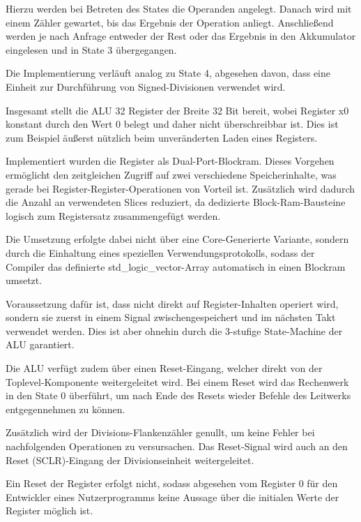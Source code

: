 Hierzu werden bei Betreten des States die Operanden angelegt. Danach wird mit einem Z\"ahler gewartet, bis das Ergebnis der Operation anliegt.
Anschlie\ss{}end werden je nach Anfrage entweder der Rest oder das Ergebnis in den Akkumulator eingelesen und in State 3 \"ubergegangen.

Die Implementierung verl\"auft analog zu State 4, abgesehen davon, dass eine Einheit zur Durchf\"uhrung von Signed-Divisionen verwendet wird.

Insgesamt stellt die ALU 32 Register der Breite 32 Bit bereit, wobei Register x0 konstant durch den Wert 0 belegt und daher nicht \"uberschreibbar ist. Dies ist zum Beispiel \"au\ss{}erst n\"utzlich beim unver\"anderten Laden eines Registers.

Implementiert wurden die Register als Dual-Port-Blockram. Dieses Vorgehen erm\"oglicht den zeitgleichen Zugriff auf zwei verschiedene Speicherinhalte, was gerade bei Register-Register-Operationen von Vorteil ist. Zus\"atzlich wird dadurch die Anzahl an verwendeten Slices reduziert, da dedizierte Block-Ram-Bausteine logisch zum Registersatz zusammengef\"ugt werden.\vspace{10pt}

Die Umsetzung erfolgte dabei nicht \"uber eine Core-Generierte Variante, sondern durch die Einhaltung eines speziellen Verwendungsprotokolls, sodass der Compiler das definierte std\_logic\_vector-Array automatisch in einen Blockram umsetzt.

Voraussetzung daf\"ur ist, dass nicht direkt auf Register-Inhalten operiert wird, sondern sie zuerst in einem Signal zwischengespeichert und im n\"achsten Takt verwendet werden. Dies ist aber ohnehin durch die 3-stufige State-Machine der ALU garantiert.

Die ALU verf\"ugt zudem \"uber einen Reset-Eingang, welcher direkt von der Toplevel-Komponente weitergeleitet wird. Bei einem Reset wird das Rechenwerk in den State 0 \"uberf\"uhrt, um nach Ende des Resets wieder Befehle des Leitwerks entgegennehmen zu k\"onnen.

Zus\"atzlich wird der Divisions-Flankenz\"ahler genullt, um keine Fehler bei nachfolgenden Operationen zu versursachen. Das Reset-Signal wird auch an den Reset (SCLR)-Eingang der Divisionseinheit weitergeleitet.

Ein Reset der Register erfolgt nicht, sodass abgesehen vom Register 0 f\"ur den Entwickler eines Nutzerprogramms keine Aussage \"uber die initialen Werte der Register m\"oglich ist.

